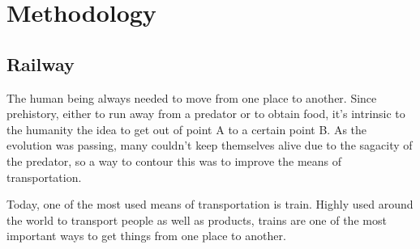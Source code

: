 \chapter{Methodology}\label{cha:methodology}
\section{Railway}\label{sec:railway}

The human being always needed to move from one place to another. 
Since prehistory, either to run away from a predator or to obtain food, it's intrinsic to the humanity the idea to get out of point A to a certain point B.
As the evolution was passing, many couldn't keep themselves alive due to the sagacity of the predator, so a way to contour this was to improve the means of transportation.

Today, one of the most used means of transportation is train.
Highly used around the world to transport people as well as products, trains are one of the most important ways to get things from one place to another.
